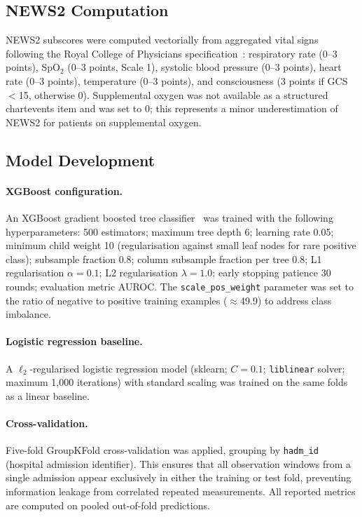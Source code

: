 \documentclass[12pt]{article}
\begin{document}
\subsection*{NEWS2 Computation}

NEWS2 subscores were computed vectorially from aggregated vital signs following
the Royal College of Physicians specification~\cite{news2}: respiratory rate
(0--3 points), SpO$_2$ (0--3 points, Scale 1), systolic blood pressure (0--3
points), heart rate (0--3 points), temperature (0--3 points), and
consciousness (3 points if GCS $<$15, otherwise 0). Supplemental oxygen was
not available as a structured chartevents item and was set to 0; this
represents a minor underestimation of NEWS2 for patients on supplemental
oxygen.

\subsection*{Model Development}

\paragraph{XGBoost configuration.}
An XGBoost gradient boosted tree classifier~\cite{chen2016_xgb} was trained
with the following hyperparameters: 500 estimators; maximum tree depth 6;
learning rate 0.05; minimum child weight 10 (regularisation against small
leaf nodes for rare positive class); subsample fraction 0.8; column subsample
fraction per tree 0.8; L1 regularisation $\alpha = 0.1$; L2 regularisation
$\lambda = 1.0$; early stopping patience 30 rounds; evaluation metric AUROC.
The \texttt{scale\_pos\_weight} parameter was set to the ratio of negative to
positive training examples ($\approx$49.9) to address class imbalance.

\paragraph{Logistic regression baseline.}
A $\ell_2$-regularised logistic regression model (sklearn; $C = 0.1$;
\texttt{liblinear} solver; maximum 1{,}000 iterations) with standard scaling
was trained on the same folds as a linear baseline.

\paragraph{Cross-validation.}
Five-fold GroupKFold cross-validation was applied, grouping by \texttt{hadm\_id}
(hospital admission identifier). This ensures that all observation windows
from a single admission appear exclusively in either the training or test fold,
preventing information leakage from correlated repeated measurements. All
reported metrics are computed on pooled out-of-fold predictions.
\end{document}
